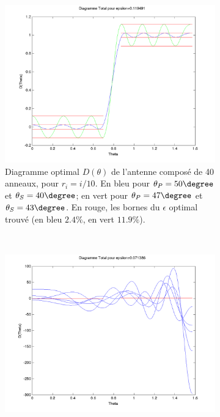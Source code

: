 \begin{figure}[h!]
  \centering
  \begin{subfigure}[b]{0.32\textwidth}
  \includegraphics[width=1.1\textwidth]{D-ModLin.png}
  \caption{Diagramme optimal $D(\theta)$ de l'antenne composé de 40 anneaux, pour $r_i=i/10$. En bleu pour $\theta_P=50 \degree$ et $\theta_S=40 \degree$; en vert pour $\theta_P=47 \degree$ et $\theta_S=43 \degree$. En rouge, les bornes du $\epsilon$ optimal trouvé (en bleu $2.4 \%$, en vert $11.9 \%$).}
  \label{fig:D-ModLin}
  \end{subfigure}%
  ~ 
  \begin{subfigure}[b]{0.32\textwidth}
  \includegraphics[width=1.1\textwidth]{D-ModLin-2RobustTau01.png}

\end{subfigure}
\end{figure}
